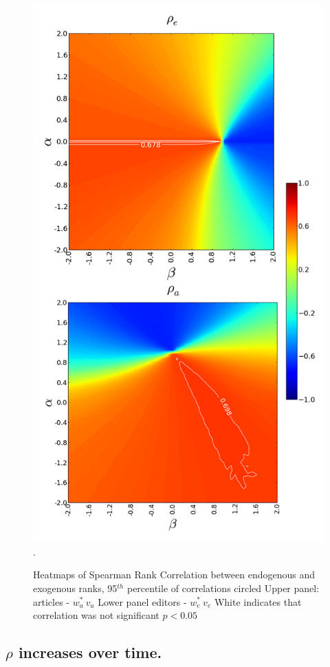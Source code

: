 \begin{figure}[!t]
\centering
\includegraphics[width=0.9\columnwidth]{Figures/contour_fem_combined.png}.
\caption{Heatmaps of Spearman Rank Correlation between endogenous and exogenous ranks, 95$^{th}$ percentile  of correlations circled
Upper panel: articles - $w^*_a ~ v_a$
Lower panel editors - $w^*_e ~ v_e$
White indicates that correlation was not significant $p<0.05$ } 
\label{fig:contour_fem}
\end{figure}

\subsection{$\rho$ increases over time.}

	



